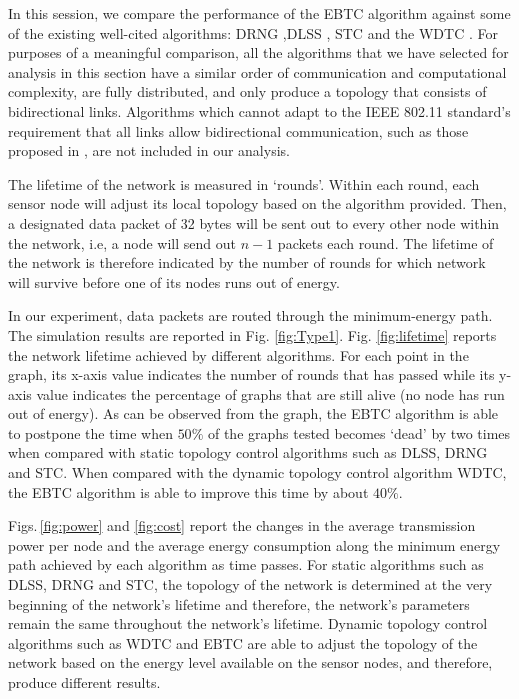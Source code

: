 \documentclass[journal,12pt,onecolumn]{IEEEtran}
\begin{document}
In this session, we compare the performance of the EBTC algorithm
against some of the existing well-cited algorithms: DRNG \cite{LiHou2005-1313},DLSS \cite{LiHou2005-1313}, STC \cite{SetGer2010} and the
WDTC \cite{SunYua2011}. For
purposes of a meaningful comparison, all the algorithms that we have
selected for analysis in this section have a similar order of
communication and computational complexity, are fully distributed, and
only produce a topology that consists of bidirectional
links. Algorithms which cannot adapt to the IEEE 802.11 standard's
requirement that all links allow bidirectional communication, such
as those proposed in \cite{ChuSet2012}, are not included in our analysis.




The lifetime of the network is measured in `rounds'. Within each
round, each sensor node will adjust its local topology based on the
algorithm provided. Then, a designated data packet of 32 bytes will be
sent out to every other node within the network, i.e, a node will send
out $n-1$ packets each round. The lifetime of the network is therefore
indicated by the number of rounds for which network will survive
before one of its nodes runs out of energy.

In our experiment, data packets are routed through the minimum-energy
path. The simulation results are reported in
Fig.\,\,\ref{fig:Type1}. Fig.\,\,\ref{fig:lifetime} reports the
network lifetime achieved by different algorithms. For each point in
the graph, its x-axis value indicates the number of rounds that has
passed while its y-axis value indicates the percentage of graphs that
are still alive (no node has run out of energy). As can be observed
from the graph, the EBTC algorithm is able to postpone the time when
$50\%$ of the graphs tested becomes `dead' by two times when compared
with static topology control algorithms such as DLSS, DRNG and STC. When
compared with the dynamic topology control algorithm WDTC, the EBTC
algorithm is able to improve this time by about $40\%$.

Figs.\,\ref{fig:power} and \ref{fig:cost} report the changes in the
average transmission power per node and the average energy
consumption along the minimum energy path achieved by each algorithm
as time passes. For static algorithms such as DLSS, DRNG and STC,
the topology of the network is determined at the very beginning of
the network's lifetime and therefore, the network's parameters
remain the same throughout the network's lifetime. Dynamic topology
control algorithms such as WDTC and EBTC are able to adjust the
topology of the network based on the energy level available on the
sensor nodes, and therefore, produce different results.
\end{document}

